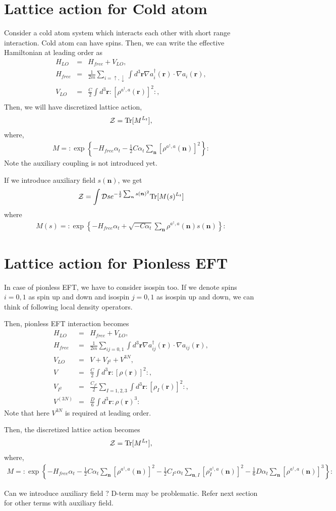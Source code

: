 \documentclass[10pt]{book}
\def\bm{\boldsymbol}
\newcommand{\bea}{\begin{eqnarray}}
\newcommand{\eea}{\end{eqnarray}}
\newcommand{\no}{\nonumber \\}
\def\vn{{\bm n}}
\def\vr{{\bm r}}
\begin{document}
\newpage 

\section{Lattice action for Cold atom}
Consider a cold atom system which interacts each other with short range interaction.
Cold atom can have spins. Then, we can write the effective Hamiltonian at leading order
as
\bea 
H_{LO}&=& H_{free}+V_{LO},\no 
H_{free}&=&\frac{1}{2m}\sum_{i=\uparrow,\downarrow}\int d^3\vr \nabla a_i^\dagger(\vr)\cdot
 \nabla a_i(\vr),\no 
V_{LO}&=& \frac{C}{2}\int d^3\vr : [\rho^{a^\dagger,a}(\vr)]^2:,\no 
\eea 
Then, we will have discretized lattice action,
\bea 
{\cal Z}={\rm Tr}[M^{L_t}],
\eea 
where,
\bea
M=:\exp\left\{ -H_{free}\alpha_t-\frac{1}{2}C\alpha_t\sum_{\vn}[\rho^{a^\dagger,a}(\vn)]^2
  \right\}:
\eea
Note the auxiliary coupling is not introduced yet. 

If we introduce auxiliary field $s(\vn)$, we get 
\bea 
{\cal Z}=\int {\cal D}s e^{-\frac{1}{2}\sum_\vn s(\vn)^2} {\rm Tr}[M(s)^{L_t}]
\eea 
where
\bea 
M(s)=:\exp\left\{ -H_{free}\alpha_t+\sqrt{-C\alpha_t}\sum_{\vn}\rho^{a^\dagger,a}(\vn) s(\vn)
\right\}:
\eea 
\section{Lattice action for Pionless EFT} 
In case of pionless EFT, we have to consider isospin too. 
If we denote spins $i=0,1$ as spin up and down and isospin $j=0,1$ as
isospin up and down, we can think of following local density operators.

Then, pionless EFT interaction becomes
\bea 
H_{LO}&=&H_{free}+V_{LO},\no 
H_{free}&=&\frac{1}{2m}\sum_{ij=0,1}\int d^3\vr \nabla a_{ij}^\dagger(\vr)\cdot\nabla a_{ij}(\vr),
\no 
V_{LO}&=&V+V_{I^2}+V^{3N},\no 
V&=&\frac{C}{2}\int d^3\vr :[\rho(\vr)]^2:,\no 
V_{I^2}&=&\frac{C_{I^2}}{2}\sum_{I=1,2,3}\int d^3\vr :[\rho_I(\vr)]^2:,\no 
V^{(3N)}&=& \frac{D}{6}\int d^3\vr :\rho(\vr)^3:
\eea 
Note that here $V^{3N}$ is required at leading order.

Then, the discretized lattice action becomes
\bea 
{\cal Z}={\rm Tr}[M^{L_t}],
\eea 
where,
\bea
M=:\exp\left\{ -H_{free}\alpha_t-\frac{1}{2}C\alpha_t\sum_{\vn}[\rho^{a^\dagger,a}(\vn)]^2
  -\frac{1}{2}C_{I^2}\alpha_t \sum_{\vn,I}[\rho^{a^\dagger,a}_I(\vn)]^2
  -\frac{1}{6}D\alpha_t\sum_{\vn}[\rho^{a^\dagger,a}(\vn)]^3
  \right\}:
\eea

{\color{red} Can we introduce auxiliary field ? D-term may be problematic.
	Refer next section for other terms with auxiliary field.} 
\end{document}
